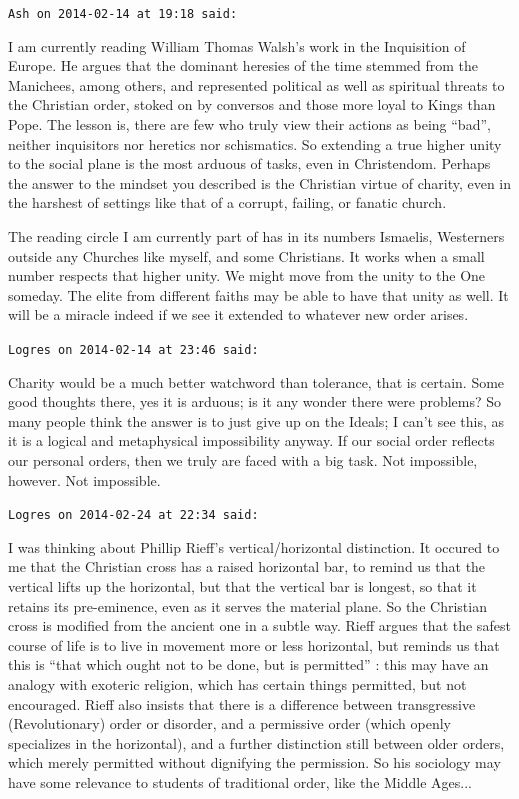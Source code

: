 \begin{footnotesize}
\begin{sffamily}
\texttt{Ash on 2014-02-14 at 19:18 said:}

I am currently reading William Thomas Walsh's work in the Inquisition of Europe. He argues that the dominant heresies of the time stemmed from the Manichees, among others, and represented political as well as spiritual threats to the Christian order, stoked on by conversos and those more loyal to Kings than Pope. The lesson is, there are few who truly view their actions as being ``bad'', neither inquisitors nor heretics nor schismatics. So extending a true higher unity to the social plane is the most arduous of tasks, even in Christendom. Perhaps the answer to the mindset you described is the Christian virtue of charity, even in the harshest of settings like that of a corrupt, failing, or fanatic church.

The reading circle I am currently part of has in its numbers Ismaelis, Westerners outside any Churches like myself, and some Christians. It works when a small number respects that higher unity. We might move from the unity to the One someday. The elite from different faiths may be able to have that unity as well. It will be a miracle indeed if we see it extended to whatever new order arises.

\hfill

\texttt{Logres on 2014-02-14 at 23:46 said:}

Charity would be a much better watchword than tolerance, that is certain. Some good thoughts there, yes it is arduous; is it any wonder there were problems? So many people think the answer is to just give up on the Ideals; I can't see this, as it is a logical and metaphysical impossibility anyway. If our social order reflects our personal orders, then we truly are faced with a big task. Not impossible, however. Not impossible.

\hfill

\texttt{Logres on 2014-02-24 at 22:34 said:}

I was thinking about Phillip Rieff's vertical/horizontal distinction. It occured to me that the Christian cross has a raised horizontal bar, to remind us that the vertical lifts up the horizontal, but that the vertical bar is longest, so that it retains its pre-eminence, even as it serves the material plane. So the Christian cross is modified from the ancient one in a subtle way. Rieff argues that the safest course of life is to live in movement more or less horizontal, but reminds us that this is ``that which ought not to be done, but is permitted'' : this may have an analogy with exoteric religion, which has certain things permitted, but not encouraged. Rieff also insists that there is a difference between transgressive (Revolutionary) order or disorder, and a permissive order (which openly specializes in the horizontal), and a further distinction still between older orders, which merely permitted without dignifying the permission. So his sociology may have some relevance to students of traditional order, like the Middle Ages... 


\end{sffamily}
\end{footnotesize}
